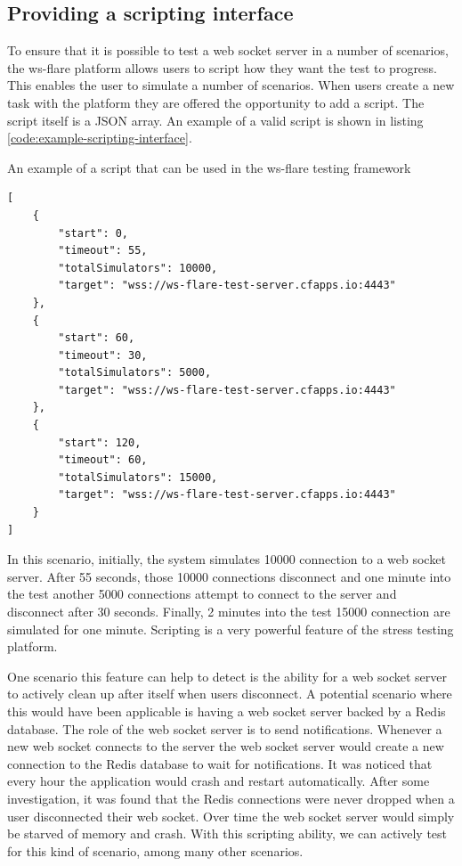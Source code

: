 \subsection{Providing a scripting interface}

To ensure that it is possible to test a web socket server in a number of scenarios, the ws-flare platform allows users to script how they want the test to progress. This enables the user to simulate a number of scenarios. When users create a new task with the platform they are offered the opportunity to add a script. The script itself is a JSON array. An example of a valid script is shown in listing \ref{code:example-scripting-interface}.

\begin{listing}[H]
    \caption{An example of a script that can be used in the ws-flare testing framework}
    \label{code:example-scripting-interface}
    \begin{verbatim}
[
    {
        "start": 0,
        "timeout": 55,
        "totalSimulators": 10000,
        "target": "wss://ws-flare-test-server.cfapps.io:4443"
    },
    {
        "start": 60,
        "timeout": 30,
        "totalSimulators": 5000,
        "target": "wss://ws-flare-test-server.cfapps.io:4443"
    },
    {
        "start": 120,
        "timeout": 60,
        "totalSimulators": 15000,
        "target": "wss://ws-flare-test-server.cfapps.io:4443"
    }
]
\end{verbatim}
\end{listing}

In this scenario, initially, the system simulates 10000 connection to a web socket server. After 55 seconds, those 10000 connections disconnect and one minute into the test another 5000 connections attempt to connect to the server and disconnect after 30 seconds. Finally, 2 minutes into the test 15000 connection are simulated for one minute. Scripting is a very powerful feature of the stress testing platform. 

One scenario this feature can help to detect is the ability for a web socket server to actively clean up after itself when users disconnect. A potential scenario where this would have been applicable is having a web socket server backed by a Redis database. The role of the web socket server is to send notifications. Whenever a new web socket connects to the server the web socket server would create a new connection to the Redis database to wait for notifications. It was noticed that every hour the application would crash and restart automatically. After some investigation, it was found that the Redis connections were never dropped when a user disconnected their web socket. Over time the web socket server would simply be starved of memory and crash. With this scripting ability, we can actively test for this kind of scenario, among many other scenarios.

